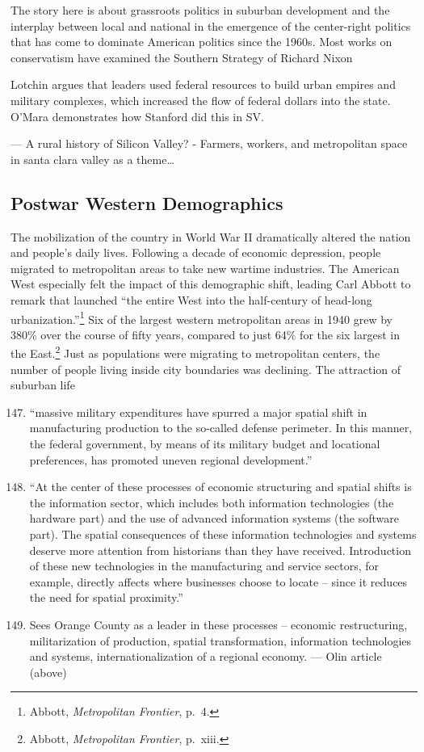 \documentclass[11pt,article,oneside]{memoir}
\begin{document}
The story here is about grassroots politics in suburban development and
the interplay between local and national in the emergence of the
center-right politics that has come to dominate American politics since
the 1960s. Most works on conservatism have examined the Southern
Strategy of Richard Nixon

Lotchin argues that leaders used federal resources to build urban
empires and military complexes, which increased the flow of federal
dollars into the state. O'Mara demonstrates how Stanford did this in SV.

--- A rural history of Silicon Valley? - Farmers, workers, and
metropolitan space in santa clara valley as a theme\ldots{}

\subsection{Postwar Western Demographics}

The mobilization of the country in World War II dramatically altered the
nation and people's daily lives. Following a decade of economic
depression, people migrated to metropolitan areas to take new wartime
industries. The American West especially felt the impact of this
demographic shift, leading Carl Abbott to remark that launched ``the
entire West into the half-century of head-long urbanization.''\footnote{Abbott,
  \emph{Metropolitan Frontier}, p.~4.} Six of the largest western
metropolitan areas in 1940 grew by 380\% over the course of fifty years,
compared to just 64\% for the six largest in the East.\footnote{Abbott,
  \emph{Metropolitan Frontier}, p.~xiii.} Just as populations were
migrating to metropolitan centers, the number of people living inside
city boundaries was declining. The attraction of suburban life

\begin{enumerate}[(1)]
\setcounter{enumi}{146}
\item
  ``massive military expenditures have spurred a major spatial shift in
  manufacturing production to the so-called defense perimeter. In this
  manner, the federal government, by means of its military budget and
  locational preferences, has promoted uneven regional development.''
\item
  ``At the center of these processes of economic structuring and spatial
  shifts is the information sector, which includes both information
  technologies (the hardware part) and the use of advanced information
  systems (the software part). The spatial consequences of these
  information technologies and systems deserve more attention from
  historians than they have received. Introduction of these new
  technologies in the manufacturing and service sectors, for example,
  directly affects where businesses choose to locate -- since it reduces
  the need for spatial proximity.''
\item
  Sees Orange County as a leader in these processes -- economic
  restructuring, militarization of production, spatial transformation,
  information technologies and systems, internationalization of a
  regional economy. --- Olin article (above)
\end{enumerate}
\end{document}
